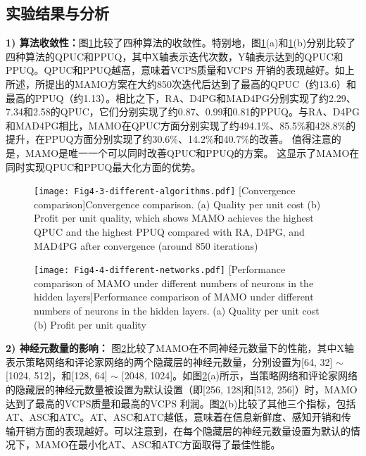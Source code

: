 \subsection{实验结果与分析}

\textbf{1) 算法收敛性：}图\ref{fig 4-3}比较了四种算法的收敛性。特别地，图\ref{fig 4-3}(a)和\ref{fig 4-3}(b)分别比较了四种算法的QPUC和PPUQ，其中X轴表示迭代次数，Y轴表示达到的QPUC和PPUQ。QPUC和PPUQ越高，意味着VCPS质量和VCPS 开销的表现越好。如上所述，所提出的MAMO方案在大约850次迭代后达到了最高的QPUC（约13.6）和最高的PPUQ（约1.13）。相比之下，RA、D4PG和MAD4PG分别实现了约2.29、7.34和2.58的QPUC，它们分别实现了约0.87、0.99和0.81的PPUQ。与RA、D4PG和MAD4PG相比，MAMO在QPUC方面分别实现了约494.1\%、85.5\%和428.8\%的提升，在PPUQ方面分别实现了约30.6\%、14.2\%和40.7\%的改善。
值得注意的是，MAMO是唯一一个可以同时改善QPUC和PPUQ的方案。
这显示了MAMO在同时实现QPUC和PPUQ最大化方面的优势。

\begin{figure}[h]
 \centering
 \texttt{[image: Fig4-3-different-algorithms.pdf]}
 [Convergence comparison]{Convergence comparison. (a) Quality per unit cost (b) Profit per unit quality, which shows MAMO achieves the highest QPUC and the highest PPUQ compared with RA, D4PG, and MAD4PG after convergence (around 850 iterations)}
 \label{fig 4-3}
\end{figure}

\begin{figure}[h]
 \centering
 \texttt{[image: Fig4-4-different-networks.pdf]}
 [Performance comparison of MAMO under different numbers of neurons in the hidden layers]{Performance comparison of MAMO under different numbers of neurons in the hidden layers. (a) Quality per unit cost (b) Profit per unit quality}
 \label{fig 4-4}
\end{figure}

\textbf{2) 神经元数量的影响：}
图\ref{fig 4-4}比较了MAMO在不同神经元数量下的性能，其中X轴表示策略网络和评论家网络的两个隐藏层的神经元数量，分别设置为[64, 32] $\sim$ [1024, 512]，和[128, 64] $\sim$ [2048, 1024]。如图\ref{fig 4-4}(a)所示，当策略网络和评论家网络的隐藏层的神经元数量被设置为默认设置（即[256, 128]和[512, 256]）时，MAMO达到了最高的VCPS质量和最高的VCPS 利润。图\ref{fig 4-4}(b)比较了其他三个指标，包括AT、ASC和ATC。AT、ASC和ATC越低，意味着在信息新鲜度、感知开销和传输开销方面的表现越好。可以注意到，在每个隐藏层的神经元数量设置为默认的情况下，MAMO在最小化AT、ASC和ATC方面取得了最佳性能。

